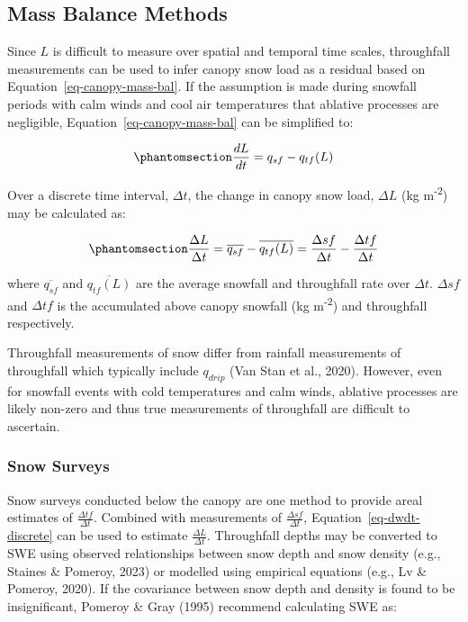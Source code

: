 \documentclass[
  letterpaper,
]{tex/uofsthesis-cs}
\begin{document}
\subsection{Mass Balance Methods}\label{sec-mass-bal-methods}

Since \(L\) is difficult to measure over spatial and temporal time
scales, throughfall measurements can be used to infer canopy snow load
as a residual based on Equation~\ref{eq-canopy-mass-bal}. If the
assumption is made during snowfall periods with calm winds and cool air
temperatures that ablative processes are negligible,
Equation~\ref{eq-canopy-mass-bal} can be simplified to:

\begin{equation}\phantomsection\label{eq-dwdt-ode}{
\frac{dL}{dt} = q_{sf}-q_{tf}(L)
}\end{equation}

Over a discrete time interval, \(\Delta t\), the change in canopy snow
load, \(\Delta L\) (kg m\textsuperscript{-2}) may be calculated as:

\begin{equation}\phantomsection\label{eq-dwdt-discrete}{
\frac{\Delta L}{\Delta t} = \overline{q_{sf}}-\overline{q_{tf}(L)} = \frac{\Delta sf}{\Delta t} - \frac{\Delta tf}{\Delta t}
}\end{equation}

where \(\overline{q_{sf}}\) and \(\overline{q_{tf}(L)}\) are the average
snowfall and throughfall rate over \(\Delta t\). \(\Delta sf\) and
\(\Delta tf\) is the accumulated above canopy snowfall (kg
m\textsuperscript{-2}) and throughfall respectively.

Throughfall measurements of snow differ from rainfall measurements of
throughfall which typically include \(q_{drip}\) (Van Stan et al.,
2020). However, even for snowfall events with cold temperatures and calm
winds, ablative processes are likely non-zero and thus true measurements
of throughfall are difficult to ascertain.

\subsubsection{Snow Surveys}\label{sec-snow-surveys}

Snow surveys conducted below the canopy are one method to provide areal
estimates of \(\frac{\Delta tf}{\Delta t}\). Combined with measurements
of \(\frac{\Delta sf}{\Delta t}\), Equation~\ref{eq-dwdt-discrete} can
be used to estimate \(\frac{\Delta L}{\Delta t}\). Throughfall depths
may be converted to SWE using observed relationships between snow depth
and snow density (e.g., Staines \& Pomeroy, 2023) or modelled using
empirical equations (e.g., Lv \& Pomeroy, 2020). If the covariance
between snow depth and density is found to be insignificant, Pomeroy \&
Gray (1995) recommend calculating SWE as:
\end{document}
